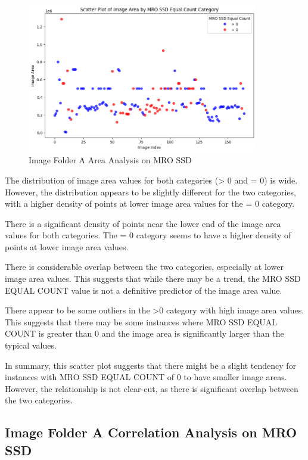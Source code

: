 \begin{figure}[ht]
    \centering
    \includegraphics[width=0.9\textwidth]{Figures/Results/sipa_02/area.png}
    \caption[Image Folder A Area Analysis on MRO SSD]{Image Folder A Area Analysis on MRO SSD}
    \label{fig:Image Folder A Area Analysis on MRO SSD}
\end{figure}


The distribution of image area values for both categories (> 0 and = 0) is wide. However, the distribution appears to be slightly different for the two categories, with a higher density of points at lower image area values for the = 0 category.

There is a significant density of points near the lower end of the image area values for both categories. The = 0 category seems to have a higher density of points at lower image area values.

There is considerable overlap between the two categories, especially at lower image area values. This suggests that while there may be a trend, the MRO SSD EQUAL COUNT value is not a definitive predictor of the image area value.

There appear to be some outliers in the >0 category with high image area values. This suggests that there may be some instances where MRO SSD EQUAL COUNT is greater than 0 and the image area is significantly larger than the typical values.

In summary, this scatter plot suggests that there might be a slight tendency for instances with MRO SSD EQUAL COUNT of 0 to have smaller image areas. However, the relationship is not clear-cut, as there is significant overlap between the two categories.



\newpage

\subsection{Image Folder A Correlation Analysis on MRO SSD}


